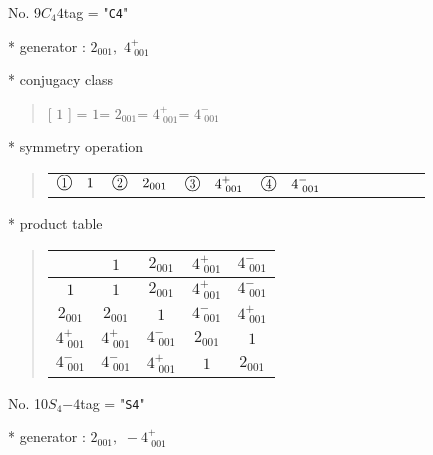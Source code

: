 \documentclass[fleqn,10pt,landscape]{jsarticle}
\begin{document}
\newpage

No. 9\quad$C_{4}$\quad$4$\quad[ tetragonal ]
tag = "{\tt C4}"

* generator : $2{}_{001},\,\,4^{+}_{\,\,001}$

* conjugacy class
\begin{quote}
[ $1$ ] = \quad $1$\newline[ $2{}_{001}$ ] = \quad $2{}_{001}$\newline[ $4^{+}_{\,\,001}$ ] = \quad $4^{+}_{\,\,001}$\newline[ $4^{-}_{\,\,001}$ ] = \quad $4^{-}_{\,\,001}$\newline
\end{quote}

* symmetry operation
\begin{quote}
\begin{tabular}{llllllllll}
$ {\ooalign{\hfil\resizebox{.8\width}{\height}{1}\hfil\crcr\raise.1ex\hbox{\large$\bigcirc$}}}\quad 1 $ & $ {\ooalign{\hfil\resizebox{.8\width}{\height}{2}\hfil\crcr\raise.1ex\hbox{\large$\bigcirc$}}}\quad 2{}_{001} $ & $ {\ooalign{\hfil\resizebox{.8\width}{\height}{3}\hfil\crcr\raise.1ex\hbox{\large$\bigcirc$}}}\quad 4^{+}_{\,\,001} $ & $ {\ooalign{\hfil\resizebox{.8\width}{\height}{4}\hfil\crcr\raise.1ex\hbox{\large$\bigcirc$}}}\quad 4^{-}_{\,\,001} $
\end{tabular}
\end{quote}

* product table
\begin{quote}
\begin{tabular}{ccccc} \hline \hline
 & $ 1 $ & $ 2{}_{001} $ & $ 4^{+}_{\,\,001} $ & $ 4^{-}_{\,\,001} $ \\ \hline
$ 1 $ & $ 1 $ & $ 2{}_{001} $ & $ 4^{+}_{\,\,001} $ & $ 4^{-}_{\,\,001} $ \\
$ 2{}_{001} $ & $ 2{}_{001} $ & $ 1 $ & $ 4^{-}_{\,\,001} $ & $ 4^{+}_{\,\,001} $ \\
$ 4^{+}_{\,\,001} $ & $ 4^{+}_{\,\,001} $ & $ 4^{-}_{\,\,001} $ & $ 2{}_{001} $ & $ 1 $ \\
$ 4^{-}_{\,\,001} $ & $ 4^{-}_{\,\,001} $ & $ 4^{+}_{\,\,001} $ & $ 1 $ & $ 2{}_{001} $ \\
 \hline \hline
\end{tabular}
\end{quote}

\newpage

No. 10\quad$S_{4}$\quad$-4$\quad[ tetragonal ]
tag = "{\tt S4}"

* generator : $2{}_{001},\,\,-4^{+}_{\,\,001}$
\end{document}
